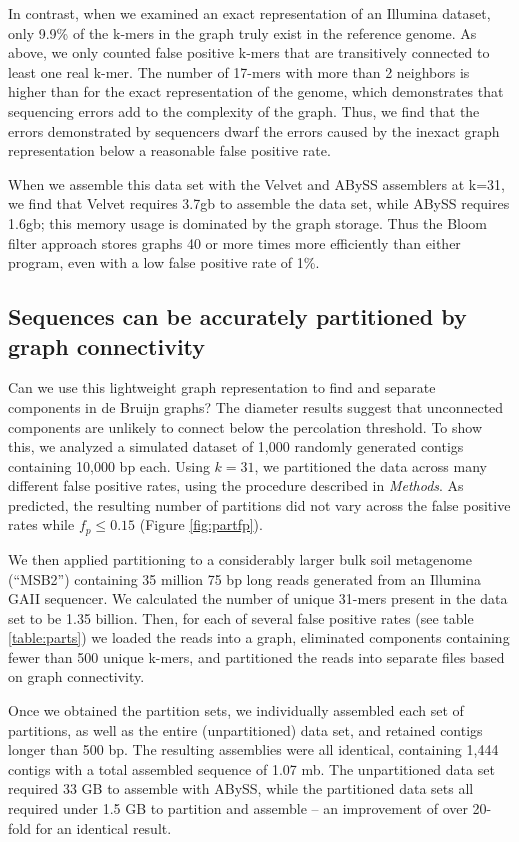 \documentclass{pnastwo}
\begin{document}
\begin{article}
In contrast, when we examined an exact representation of an Illumina
dataset, only 9.9\% of the k-mers in the graph truly exist in the
reference genome.  As above, we only counted false positive k-mers
that are transitively connected to least one real k-mer. The number of
17-mers with more than 2 neighbors is higher than for the exact
representation of the genome, which demonstrates that sequencing
errors add to the complexity of the graph. Thus, we find that the
errors demonstrated by sequencers dwarf the errors caused by the
inexact graph representation below a reasonable false positive rate.

When we assemble this data set with the Velvet and ABySS assemblers at
k=31, we find that Velvet requires 3.7gb to assemble the data set,
while ABySS requires 1.6gb; this memory usage is dominated by the
graph storage. Thus the Bloom filter approach stores graphs 40 or
more times more efficiently than either program, even with a low false
positive rate of 1\%.

\subsection{Sequences can be accurately partitioned by graph connectivity}


Can we use this lightweight graph representation to find and separate
components in de Bruijn graphs?  The diameter results suggest that
unconnected components are unlikely to connect below the percolation
threshold. To show this, we analyzed a simulated dataset of 1,000
randomly generated contigs containing 10,000 bp each.  Using $k=31$,
we partitioned the data across many different false positive rates,
using the procedure described in \emph{Methods}. As predicted, the
resulting number of partitions did not vary across the false positive
rates while $f_p \le 0.15$ (Figure \ref{fig:partfp}).

We then applied partitioning to a considerably larger bulk soil
metagenome (``MSB2'') containing 35 million 75 bp long reads generated
from an Illumina GAII sequencer.  We calculated the number of unique
31-mers present in the data set to be 1.35 billion. Then, for each of
several false positive rates (see table \ref{table:parts}) we loaded
the reads into a graph, eliminated components containing fewer than
500 unique k-mers, and partitioned the reads into separate files based
on graph connectivity.

Once we obtained the partition sets, we individually assembled each
set of partitions, as well as the entire (unpartitioned) data set, and
retained contigs longer than 500 bp.  The resulting assemblies were
all identical, containing 1,444 contigs with a total assembled
sequence of 1.07 mb.  The unpartitioned data set required 33 GB to
assemble with ABySS, while the partitioned data sets all required
under 1.5 GB to partition and assemble -- an improvement of over
20-fold for an identical result.


\end{article}
\end{document}
